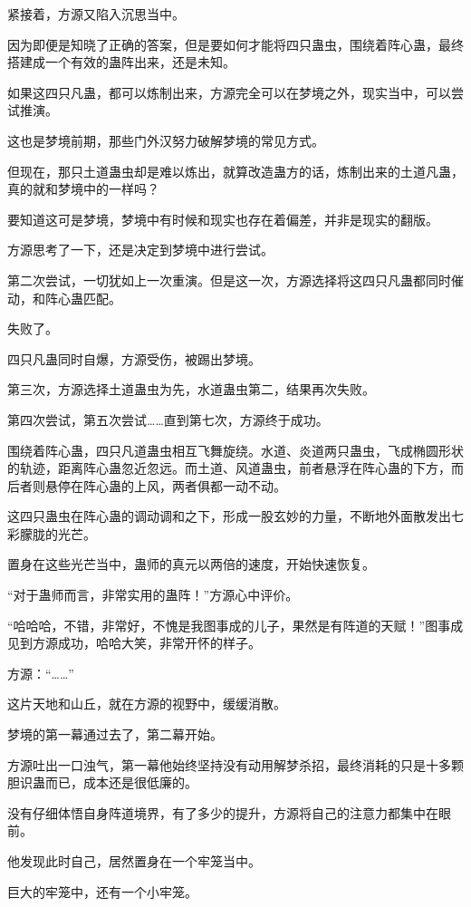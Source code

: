 \begin{this_body}
紧接着，方源又陷入沉思当中。

因为即便是知晓了正确的答案，但是要如何才能将四只蛊虫，围绕着阵心蛊，最终搭建成一个有效的蛊阵出来，还是未知。

如果这四只凡蛊，都可以炼制出来，方源完全可以在梦境之外，现实当中，可以尝试推演。

这也是梦境前期，那些门外汉努力破解梦境的常见方式。

但现在，那只土道蛊虫却是难以炼出，就算改造蛊方的话，炼制出来的土道凡蛊，真的就和梦境中的一样吗？

要知道这可是梦境，梦境中有时候和现实也存在着偏差，并非是现实的翻版。

方源思考了一下，还是决定到梦境中进行尝试。

第二次尝试，一切犹如上一次重演。但是这一次，方源选择将这四只凡蛊都同时催动，和阵心蛊匹配。

失败了。

四只凡蛊同时自爆，方源受伤，被踢出梦境。

第三次，方源选择土道蛊虫为先，水道蛊虫第二，结果再次失败。

第四次尝试，第五次尝试……直到第七次，方源终于成功。

围绕着阵心蛊，四只凡道蛊虫相互飞舞旋绕。水道、炎道两只蛊虫，飞成椭圆形状的轨迹，距离阵心蛊忽近忽远。而土道、风道蛊虫，前者悬浮在阵心蛊的下方，而后者则悬停在阵心蛊的上风，两者俱都一动不动。

这四只蛊虫在阵心蛊的调动调和之下，形成一股玄妙的力量，不断地外面散发出七彩朦胧的光芒。

置身在这些光芒当中，蛊师的真元以两倍的速度，开始快速恢复。

“对于蛊师而言，非常实用的蛊阵！”方源心中评价。

“哈哈哈，不错，非常好，不愧是我图事成的儿子，果然是有阵道的天赋！”图事成见到方源成功，哈哈大笑，非常开怀的样子。

方源：“……”

这片天地和山丘，就在方源的视野中，缓缓消散。

梦境的第一幕通过去了，第二幕开始。

方源吐出一口浊气，第一幕他始终坚持没有动用解梦杀招，最终消耗的只是十多颗胆识蛊而已，成本还是很低廉的。

没有仔细体悟自身阵道境界，有了多少的提升，方源将自己的注意力都集中在眼前。

他发现此时自己，居然置身在一个牢笼当中。

巨大的牢笼中，还有一个小牢笼。


\end{this_body}
